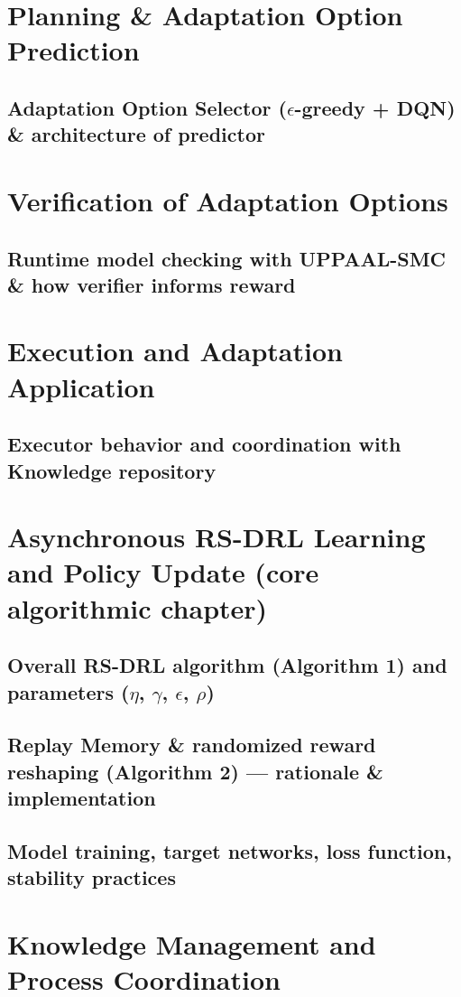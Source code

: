 \documentclass[11pt,a4paper]{article}
\begin{document}
\section{Planning \& Adaptation Option Prediction}
\subsection{Adaptation Option Selector ($\epsilon$-greedy + DQN) \& architecture of predictor}

\section{Verification of Adaptation Options}
\subsection{Runtime model checking with UPPAAL-SMC \& how verifier informs reward}

\section{Execution and Adaptation Application}
\subsection{Executor behavior and coordination with Knowledge repository}

\section{Asynchronous RS-DRL Learning and Policy Update (core algorithmic chapter)}
\subsection{Overall RS-DRL algorithm (Algorithm 1) and parameters ($\eta$, $\gamma$, $\epsilon$, $\rho$)}
\subsection{Replay Memory \& randomized reward reshaping (Algorithm 2) --- rationale \& implementation}
\subsection{Model training, target networks, loss function, stability practices}

\section{Knowledge Management and Process Coordination}
\end{document}
